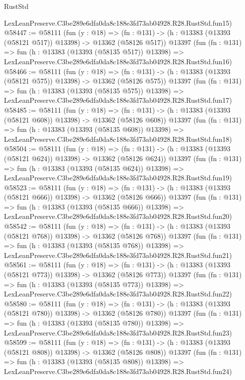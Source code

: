 \begin{lexlean}{RustStd}
\begin{coremodule}
    LexLeanPreserve.C3be289e6dfa0da8c188e3fd73ab04928.R28.RustStd.fun15)
@58447 := @58111
    (fun (y : @18) =>
    (fn : @131) -> (h : @13383 (@13393 (@58121 @517)) @13398) -> @13362 (@58126 @517))
    @13397
    (fun (fn : @131) =>
    fun (h : @13383 (@13393 (@58135 @517)) @13398) =>
    LexLeanPreserve.C3be289e6dfa0da8c188e3fd73ab04928.R28.RustStd.fun16)
@58466 := @58111
    (fun (y : @18) =>
    (fn : @131) -> (h : @13383 (@13393 (@58121 @575)) @13398) -> @13362 (@58126 @575))
    @13397
    (fun (fn : @131) =>
    fun (h : @13383 (@13393 (@58135 @575)) @13398) =>
    LexLeanPreserve.C3be289e6dfa0da8c188e3fd73ab04928.R28.RustStd.fun17)
@58485 := @58111
    (fun (y : @18) =>
    (fn : @131) -> (h : @13383 (@13393 (@58121 @608)) @13398) -> @13362 (@58126 @608))
    @13397
    (fun (fn : @131) =>
    fun (h : @13383 (@13393 (@58135 @608)) @13398) =>
    LexLeanPreserve.C3be289e6dfa0da8c188e3fd73ab04928.R28.RustStd.fun18)
@58504 := @58111
    (fun (y : @18) =>
    (fn : @131) -> (h : @13383 (@13393 (@58121 @624)) @13398) -> @13362 (@58126 @624))
    @13397
    (fun (fn : @131) =>
    fun (h : @13383 (@13393 (@58135 @624)) @13398) =>
    LexLeanPreserve.C3be289e6dfa0da8c188e3fd73ab04928.R28.RustStd.fun19)
@58523 := @58111
    (fun (y : @18) =>
    (fn : @131) -> (h : @13383 (@13393 (@58121 @666)) @13398) -> @13362 (@58126 @666))
    @13397
    (fun (fn : @131) =>
    fun (h : @13383 (@13393 (@58135 @666)) @13398) =>
    LexLeanPreserve.C3be289e6dfa0da8c188e3fd73ab04928.R28.RustStd.fun20)
@58542 := @58111
    (fun (y : @18) =>
    (fn : @131) -> (h : @13383 (@13393 (@58121 @768)) @13398) -> @13362 (@58126 @768))
    @13397
    (fun (fn : @131) =>
    fun (h : @13383 (@13393 (@58135 @768)) @13398) =>
    LexLeanPreserve.C3be289e6dfa0da8c188e3fd73ab04928.R28.RustStd.fun21)
@58561 := @58111
    (fun (y : @18) =>
    (fn : @131) -> (h : @13383 (@13393 (@58121 @773)) @13398) -> @13362 (@58126 @773))
    @13397
    (fun (fn : @131) =>
    fun (h : @13383 (@13393 (@58135 @773)) @13398) =>
    LexLeanPreserve.C3be289e6dfa0da8c188e3fd73ab04928.R28.RustStd.fun22)
@58580 := @58111
    (fun (y : @18) =>
    (fn : @131) -> (h : @13383 (@13393 (@58121 @780)) @13398) -> @13362 (@58126 @780))
    @13397
    (fun (fn : @131) =>
    fun (h : @13383 (@13393 (@58135 @780)) @13398) =>
    LexLeanPreserve.C3be289e6dfa0da8c188e3fd73ab04928.R28.RustStd.fun23)
@58599 := @58111
    (fun (y : @18) =>
    (fn : @131) -> (h : @13383 (@13393 (@58121 @808)) @13398) -> @13362 (@58126 @808))
    @13397
    (fun (fn : @131) =>
    fun (h : @13383 (@13393 (@58135 @808)) @13398) =>
    LexLeanPreserve.C3be289e6dfa0da8c188e3fd73ab04928.R28.RustStd.fun24)

\end{coremodule}
\end{lexlean}
